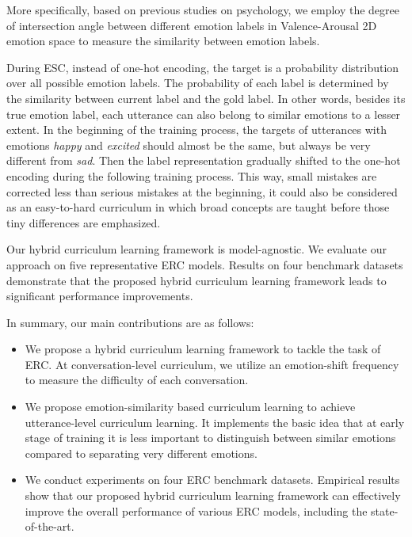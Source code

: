 \documentclass[letterpaper]{article} \usepackage{aaai22}  \usepackage{times}  \usepackage{helvet}  \usepackage{courier}  \usepackage[hyphens]{url}  \usepackage{graphicx} \urlstyle{rm} \def\UrlFont{\rm}  \usepackage{natbib}  \usepackage{caption} \DeclareCaptionStyle{ruled}{labelfont=normalfont,labelsep=colon,strut=off} \frenchspacing  \setlength{\pdfpagewidth}{8.5in}  \setlength{\pdfpageheight}{11in}
\begin{document}
More specifically, based on previous studies \cite{plutchik1982psychoevolutionary,mikels2005emotional} on psychology,  we employ the degree of intersection angle between different emotion labels in Valence-Arousal 2D emotion space \cite{guo2019dean,yang2021circular} to measure the similarity between emotion labels. 

During ESC, instead of one-hot encoding, the target is a probability distribution over all possible emotion labels. The probability of each label is determined by the similarity between current label and the gold label. In other words, besides its true emotion label, each utterance can also belong to similar emotions to a lesser extent.  In the beginning of the training process, the targets of utterances with emotions \emph{happy} and \emph{excited} should almost be the same, but always be very different from \emph{sad}. Then the label representation gradually shifted to the one-hot encoding during the following training process. This way, small mistakes are corrected less than serious mistakes at the beginning, it could also be considered as an easy-to-hard curriculum in which broad concepts are taught before those tiny differences are emphasized. 

Our hybrid curriculum learning framework is model-agnostic. We evaluate our approach on five representative ERC models. Results on four benchmark datasets demonstrate that the proposed hybrid curriculum learning framework leads to significant performance improvements. 


In summary, our main contributions are as follows:

\begin{itemize}
	\item We propose a hybrid curriculum learning framework to tackle the task of ERC. At conversation-level curriculum, we utilize an emotion-shift frequency to measure the difficulty of each conversation.
	\item We propose emotion-similarity based curriculum learning to achieve utterance-level curriculum learning. It implements the basic idea that at early stage of training it is less important to distinguish between similar emotions compared to separating very different emotions. 
	\item We conduct experiments  on four ERC benchmark datasets. Empirical results show that our proposed hybrid curriculum learning framework can effectively improve the overall performance of various ERC models,  including the state-of-the-art. 	
\end{itemize}
\end{document}

